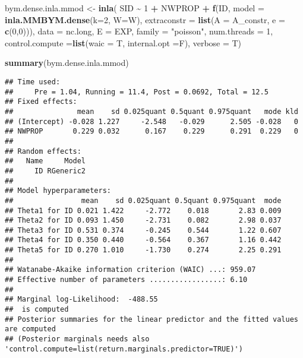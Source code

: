 \documentclass[
]{article}
\newenvironment{Shaded}{\begin{snugshade}}{\end{snugshade}}
\newcommand{\AttributeTok}[1]{\textcolor[rgb]{0.13,0.29,0.53}{#1}}
\newcommand{\DecValTok}[1]{\textcolor[rgb]{0.00,0.00,0.81}{#1}}
\newcommand{\FunctionTok}[1]{\textcolor[rgb]{0.13,0.29,0.53}{\textbf{#1}}}
\newcommand{\NormalTok}[1]{#1}
\newcommand{\OtherTok}[1]{\textcolor[rgb]{0.56,0.35,0.01}{#1}}
\newcommand{\SpecialCharTok}[1]{\textcolor[rgb]{0.81,0.36,0.00}{\textbf{#1}}}
\newcommand{\StringTok}[1]{\textcolor[rgb]{0.31,0.60,0.02}{#1}}
\begin{document}
\begin{Shaded}
\begin{Highlighting}[]
\NormalTok{bym.dense.inla.mmod }\OtherTok{\textless{}{-}} \FunctionTok{inla}\NormalTok{(}
\NormalTok{    SID }\SpecialCharTok{\textasciitilde{}} \DecValTok{1} \SpecialCharTok{+}\NormalTok{ NWPROP }\SpecialCharTok{+} 
    \FunctionTok{f}\NormalTok{(ID, }\AttributeTok{model =} \FunctionTok{inla.MMBYM.dense}\NormalTok{(}\AttributeTok{k=}\DecValTok{2}\NormalTok{, }\AttributeTok{W=}\NormalTok{W),}
      \AttributeTok{extraconstr =} \FunctionTok{list}\NormalTok{(}\AttributeTok{A =}\NormalTok{ A\_constr, }\AttributeTok{e =} \FunctionTok{c}\NormalTok{(}\DecValTok{0}\NormalTok{,}\DecValTok{0}\NormalTok{))),}
  \AttributeTok{data =}\NormalTok{ nc.long, }\AttributeTok{E =}\NormalTok{ EXP, }
  \AttributeTok{family =} \StringTok{"poisson"}\NormalTok{, }\AttributeTok{num.threads =} \DecValTok{1}\NormalTok{,}
  \AttributeTok{control.compute =}\FunctionTok{list}\NormalTok{(}\AttributeTok{waic =}\NormalTok{ T, }\AttributeTok{internal.opt =}\NormalTok{F),}
  \AttributeTok{verbose =}\NormalTok{ T)}
\end{Highlighting}
\end{Shaded}

\begin{Shaded}
\begin{Highlighting}[]
\FunctionTok{summary}\NormalTok{(bym.dense.inla.mmod)}
\end{Highlighting}
\end{Shaded}

\begin{verbatim}
## Time used:
##     Pre = 1.04, Running = 11.4, Post = 0.0692, Total = 12.5 
## Fixed effects:
##               mean    sd 0.025quant 0.5quant 0.975quant   mode kld
## (Intercept) -0.028 1.227     -2.548   -0.029      2.505 -0.028   0
## NWPROP       0.229 0.032      0.167    0.229      0.291  0.229   0
## 
## Random effects:
##   Name     Model
##     ID RGeneric2
## 
## Model hyperparameters:
##                mean    sd 0.025quant 0.5quant 0.975quant  mode
## Theta1 for ID 0.021 1.422     -2.772    0.018       2.83 0.009
## Theta2 for ID 0.093 1.450     -2.731    0.082       2.98 0.037
## Theta3 for ID 0.531 0.374     -0.245    0.544       1.22 0.607
## Theta4 for ID 0.350 0.440     -0.564    0.367       1.16 0.442
## Theta5 for ID 0.270 1.010     -1.730    0.274       2.25 0.291
## 
## Watanabe-Akaike information criterion (WAIC) ...: 959.07
## Effective number of parameters .................: 6.10
## 
## Marginal log-Likelihood:  -488.55 
##  is computed 
## Posterior summaries for the linear predictor and the fitted values are computed
## (Posterior marginals needs also 'control.compute=list(return.marginals.predictor=TRUE)')
\end{verbatim}
\end{document}
